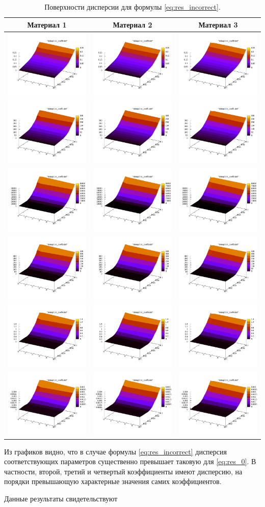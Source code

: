 \documentclass[12pt,a4paper]{article}
\theoremstyle{definition}
\begin{document}
\begin{table}[h]
  \centering
  \begin{tabular}{c c c}
	Материал 1 & Материал 2 & Материал 3 \\ \hline
	\includegraphics[scale=0.20]{figs/all/p1.txt_coeff0.dat.pdf} & \includegraphics[scale=0.20]{figs/all/p2.txt_coeff0.dat.pdf} & \includegraphics[scale=0.20]{figs/all/p3.txt_coeff0.dat.pdf} \\
	\includegraphics[scale=0.20]{figs/all/p1.txt_coeff1.dat.pdf} & \includegraphics[scale=0.20]{figs/all/p2.txt_coeff1.dat.pdf} & \includegraphics[scale=0.20]{figs/all/p3.txt_coeff1.dat.pdf} \\
	\includegraphics[scale=0.20]{figs/all/p1.txt_coeff2.dat.pdf} & \includegraphics[scale=0.20]{figs/all/p2.txt_coeff2.dat.pdf} & \includegraphics[scale=0.20]{figs/all/p3.txt_coeff2.dat.pdf} \\
	\includegraphics[scale=0.20]{figs/all/p1.txt_coeff3.dat.pdf} & \includegraphics[scale=0.20]{figs/all/p2.txt_coeff3.dat.pdf} & \includegraphics[scale=0.20]{figs/all/p3.txt_coeff3.dat.pdf} \\
	\includegraphics[scale=0.20]{figs/all/p1.txt_coeff4.dat.pdf} & \includegraphics[scale=0.20]{figs/all/p2.txt_coeff4.dat.pdf} & \includegraphics[scale=0.20]{figs/all/p3.txt_coeff4.dat.pdf} \\
	\includegraphics[scale=0.20]{figs/all/p1.txt_coeff5.dat.pdf} & \includegraphics[scale=0.20]{figs/all/p2.txt_coeff5.dat.pdf} & \includegraphics[scale=0.20]{figs/all/p3.txt_coeff5.dat.pdf}
  \end{tabular}
  \caption{Поверхности дисперсии для формулы \eqref{eq:res_incorrect}.}
  \label{tabl:res_incorrect}
\end{table}

Из графиков видно, что в случае формулы \eqref{eq:res_incorrect} дисперсия соответствующих
параметров существенно превышает таковую для \eqref{eq:res_0}. В частности, второй, третий
и четвертый коэффициенты имеют дисперсию, на порядки превышающую характерные значения самих
коэффициентов.

Данные результаты свидетельствуют 
\end{document}

